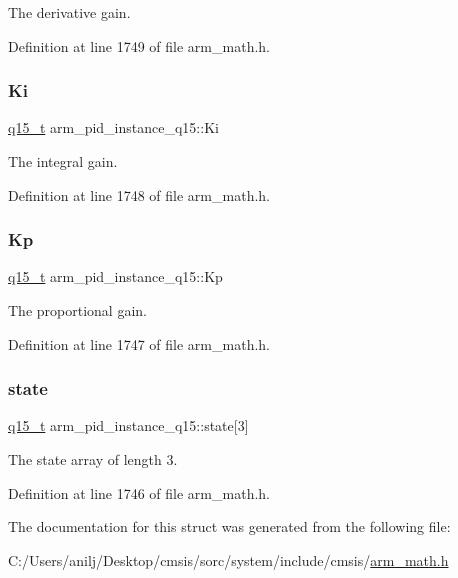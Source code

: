 The derivative gain. 

Definition at line 1749 of file arm\+\_\+math.\+h.

\mbox{\label{structarm__pid__instance__q15_a0dcc19d5c8f7bc401acea9e8318cd777}} 
\subsubsection{\texorpdfstring{Ki}{Ki}}
{\footnotesize\ttfamily \hyperlink{arm__math_8h_ab5a8fb21a5b3b983d5f54f31614052ea}{q15\+\_\+t} arm\+\_\+pid\+\_\+instance\+\_\+q15\+::\+Ki}

The integral gain. 

Definition at line 1748 of file arm\+\_\+math.\+h.

\mbox{\label{structarm__pid__instance__q15_ad228aae24a1b6d855c93a8b9bbc1c4f1}} 
\subsubsection{\texorpdfstring{Kp}{Kp}}
{\footnotesize\ttfamily \hyperlink{arm__math_8h_ab5a8fb21a5b3b983d5f54f31614052ea}{q15\+\_\+t} arm\+\_\+pid\+\_\+instance\+\_\+q15\+::\+Kp}

The proportional gain. 

Definition at line 1747 of file arm\+\_\+math.\+h.

\mbox{\label{structarm__pid__instance__q15_a4a3f0a878b5b6b055e3478a2f244cd30}} 
\subsubsection{\texorpdfstring{state}{state}}
{\footnotesize\ttfamily \hyperlink{arm__math_8h_ab5a8fb21a5b3b983d5f54f31614052ea}{q15\+\_\+t} arm\+\_\+pid\+\_\+instance\+\_\+q15\+::state\mbox{[}3\mbox{]}}

The state array of length 3. 

Definition at line 1746 of file arm\+\_\+math.\+h.



The documentation for this struct was generated from the following file\+:\begin{DoxyCompactItemize}
\item 
C\+:/\+Users/anilj/\+Desktop/cmsis/sorc/system/include/cmsis/\hyperlink{arm__math_8h}{arm\+\_\+math.\+h}\end{DoxyCompactItemize}
